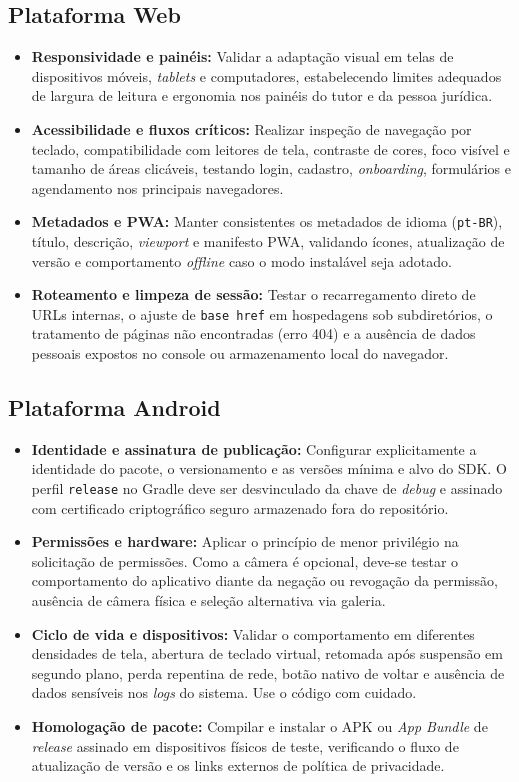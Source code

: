 \documentclass[12pt,a4paper]{article}
\begin{document}
\subsection{Plataforma Web}
\begin{itemize}[leftmargin=*]
  \item \textbf{Responsividade e painéis:} Validar a adaptação visual em telas de dispositivos móveis, \textit{tablets} e computadores, estabelecendo limites adequados de largura de leitura e ergonomia nos painéis do tutor e da pessoa jurídica.
  \item \textbf{Acessibilidade e fluxos críticos:} Realizar inspeção de navegação por teclado, compatibilidade com leitores de tela, contraste de cores, foco visível e tamanho de áreas clicáveis, testando login, cadastro, \textit{onboarding}, formulários e agendamento nos principais navegadores.
  \item \textbf{Metadados e PWA:} Manter consistentes os metadados de idioma (\texttt{pt-BR}), título, descrição, \textit{viewport} e manifesto PWA, validando ícones, atualização de versão e comportamento \textit{offline} caso o modo instalável seja adotado.
  \item \textbf{Roteamento e limpeza de sessão:} Testar o recarregamento direto de URLs internas, o ajuste de \texttt{base href} em hospedagens sob subdiretórios, o tratamento de páginas não encontradas (erro 404) e a ausência de dados pessoais expostos no console ou armazenamento local do navegador.
\end{itemize}

\subsection{Plataforma Android}
\begin{itemize}[leftmargin=*]
  \item \textbf{Identidade e assinatura de publicação:} Configurar explicitamente a identidade do pacote, o versionamento e as versões mínima e alvo do SDK. O perfil \texttt{release} no Gradle deve ser desvinculado da chave de \textit{debug} e assinado com certificado criptográfico seguro armazenado fora do repositório.
  \item \textbf{Permissões e hardware:} Aplicar o princípio de menor privilégio na solicitação de permissões. Como a câmera é opcional, deve-se testar o comportamento do aplicativo diante da negação ou revogação da permissão, ausência de câmera física e seleção alternativa via galeria.
  \item \textbf{Ciclo de vida e dispositivos:} Validar o comportamento em diferentes densidades de tela, abertura de teclado virtual, retomada após suspensão em segundo plano, perda repentina de rede, botão nativo de voltar e ausência de dados sensíveis nos \textit{logs} do sistema.
Use o código com cuidado.
\item \textbf{Homologação de pacote:} Compilar e instalar o APK ou \textit{App Bundle} de \textit{release} assinado em dispositivos físicos de teste, verificando o fluxo de atualização de versão e os links externos de política de privacidade.
\end{itemize}
\end{document}

